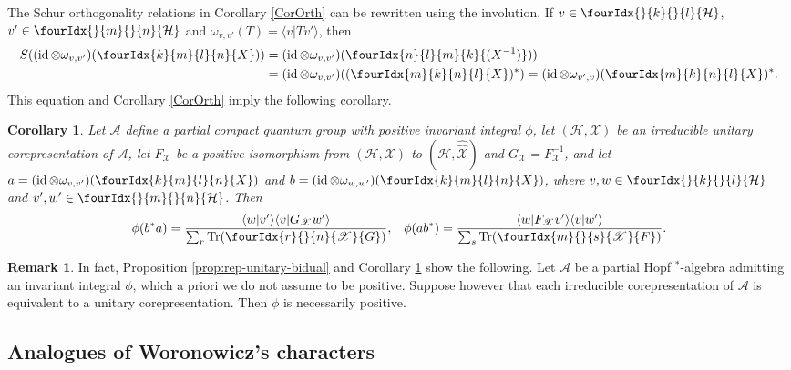 \documentclass[10pt]{article}
\DeclareMathOperator{\id}{id}
\newcommand{\dualco}[1]{\hat{#1}}
\newcommand{\Hsp}{\mathcal{H}}
\newcommand{\Tr}{\mathrm{Tr}}
\newcommand{\Gr}[5]{\fourIdx{#2}{#4}{#3}{#5}{#1}}%
\newcommand{\Gru}[3]{\Gr{#1}{}{}{#2}{#3}}
\newtheorem{Cor}[Theorem]{Corollary}
\theoremstyle{definition}
\newtheorem{Rem}[Theorem]{Remark}
\numberwithin{equation}{section}
\begin{document}
The Schur orthogonality relations in Corollary \ref{CorOrth} can be
rewritten using the involution. If $v \in \Gru{\Hsp}{k}{l}$, $v' \in \Gru{\Hsp}{m}{n}$
and $\omega_{v,v'}(T) = \langle v|Tv'\rangle$, then 
\begin{align*}
  S((\id \otimes \omega_{v,v'})(\Gr{X}{k}{l}{m}{n})) &=
  (\id \otimes \omega_{v,v'}) (\Gr{(X^{-1})}{n}{m}{l}{k})) \\ & =
  (\id \otimes \omega_{v,v'})( (\Gr{X}{m}{n}{k}{l})^{*}) =
  (\id \otimes \omega_{v',v})(\Gr{X}{m}{n}{k}{l})^{*}.
\end{align*}
This equation and Corollary \ref{CorOrth} imply the following corollary.
\begin{Cor}\label{cor:rep-unitary-schur-orthogonality}
  Let $\mathscr{A}$ define a partial compact quantum group with
  positive invariant integral $\phi$, let $(\Hsp,\mathscr{X})$ be an irreducible
  unitary corepresentation of $\mathscr{A}$, let $F_{\mathscr{X}}$ be a positive
  isomorphism from $(\Hsp,\mathscr{X})$ to
  $(\Hsp,\dualco{\dualco{\mathscr{X}}})$ and
  $G_{\mathscr{X}}=F^{-1}_{{\mathscr{X}}}$, and let $a=(\id \otimes
  \omega_{v,v'})(\Gr{X}{k}{l}{m}{n})$ and $b=(\id \otimes
  \omega_{w,w'})(\Gr{X}{k}{l}{m}{n})$, where $v,w \in
  \Gru{\Hsp}{k}{l}$ and $v',w' \in \Gru{\Hsp}{m}{n}$.  Then
\begin{align*}
  \phi(b^{*}a) &= \frac{\langle w|v'\rangle\langle v|G_{\mathscr{X}}w'\rangle}{\sum_{r}
    \Tr(\Gr{G}{r}{n}{}{\mathscr{X}})}, & \phi(ab^{*}) = \frac{\langle
    w|F_{\mathscr{X}}v'\rangle \langle v|w'\rangle}{\sum_{s}
    \Tr(\Gr{F}{m}{s}{}{\mathscr{X}})}.
\end{align*}
\end{Cor}

\begin{Rem}\label{RemPos} In fact, Proposition \ref{prop:rep-unitary-bidual} and Corollary \ref{cor:rep-unitary-schur-orthogonality} show the following. Let $\mathscr{A}$ be a partial Hopf $^*$-algebra admitting an invariant integral $\phi$, which a priori we do not assume to be positive. Suppose however that each irreducible corepresentation of $\mathscr{A}$ is equivalent to a unitary corepresentation. Then $\phi$ is necessarily positive.
\end{Rem} 

\subsection{Analogues of Woronowicz's  characters}
\end{document}
